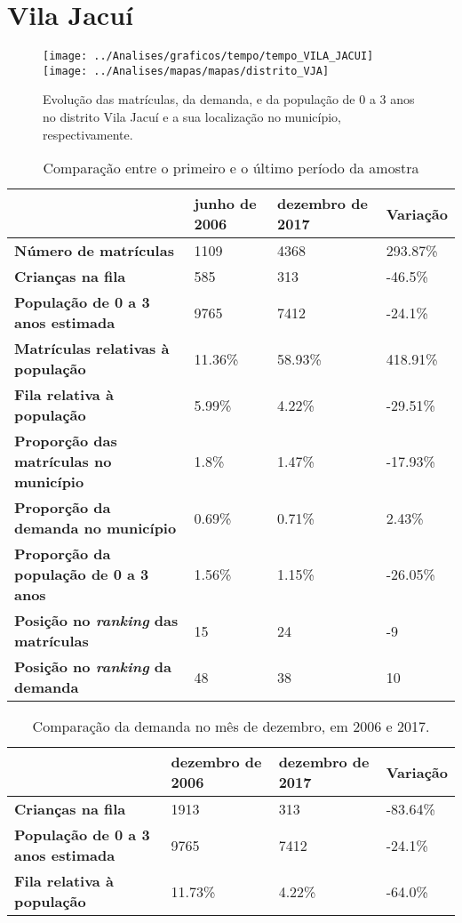 \section{Vila Jacuí}
\begin{figure}[H]
\centering
\texttt{[image: ../Analises/graficos/tempo/tempo\_VILA\_JACUI]}
\texttt{[image: ../Analises/mapas/mapas/distrito\_VJA]}
\caption{Evolução das matrículas, da demanda, e da população de 0 a 3 anos no distrito Vila Jacuí e a sua localização no município, respectivamente.}
\end{figure}
\begin{table}[H]
\begin{tabular}{l|l|l|l}
\textbf{}                                      & \textbf{junho de 2006}       & \textbf{dezembro de 2017}    & \textbf{Variação} \\ \hline
\textbf{Número de matrículas}                  & 1109 & 4368 & 293.87\% \\ \hline
\textbf{Crianças na fila}                      & 585 & 313 & -46.5\% \\ \hline
\textbf{População de 0 a 3 anos estimada}      & 9765 & 7412 & -24.1\% \\ \hline
\textbf{Matrículas relativas à população}      & 11.36\% & 58.93\% & 418.91\% \\ \hline
\textbf{Fila relativa à população}             & 5.99\% & 4.22\% & -29.51\% \\ \hline
\textbf{Proporção das matrículas no município} & 1.8\% & 1.47\% & -17.93\% \\ \hline
\textbf{Proporção da demanda no município}     & 0.69\% & 0.71\% & 2.43\% \\ \hline
\textbf{Proporção da população de 0 a 3 anos}  & 1.56\% & 1.15\% & -26.05\% \\ \hline
\textbf{Posição no \textit{ranking} das matrículas}     & 15 & 24 & -9 \\ \hline
\textbf{Posição no \textit{ranking} da demanda}         & 48 & 38 & 10 \\ 
\end{tabular}
\caption{Comparação entre o primeiro e o último período da amostra}
\end{table}
\begin{table}[H]
\begin{tabular}{l|l|l|l}
\textbf{}                                 & \textbf{dezembro de 2006} & \textbf{dezembro de 2017} & \textbf{Variação} \\ \hline
\textbf{Crianças na fila}                      & 1913 & 313 & -83.64\% \\ \hline
\textbf{População de 0 a 3 anos estimada}      & 9765 & 7412 & -24.1\% \\ \hline
\textbf{Fila relativa à população}             & 11.73\% & 4.22\% & -64.0\% \\
\end{tabular}
\caption{Comparação da demanda no mês de dezembro, em 2006 e 2017.}
\end{table}
